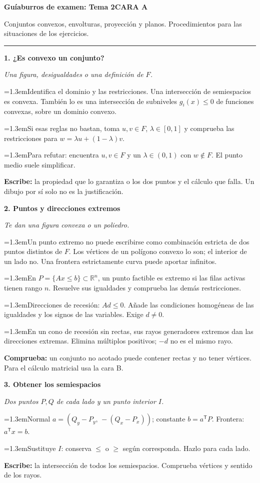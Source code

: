 \documentclass[a4paper,landscape]{article}
\newcommand{\R}{\mathbb R}
\newcommand{\T}{^{\mathsf T}}
\newcommand{\caso}[2]{\par\vspace{5pt}\colorbox{pale}{\parbox{\dimexpr\linewidth-2\fboxsep}{\bfseries\color{accent}#1}}\par\textit{#2}\par}
\newcommand{\paso}[2]{\par\hangindent=1.3em\hangafter=1\makebox[1.3em][l]{\textbf{\color{accent}#1}}#2}
\newcommand{\escribe}[1]{\par\textbf{Escribe:} #1}
\newcommand{\ojo}[1]{\par\textbf{Comprueba:} #1}
\newcommand{\cabecera}[2]{%
  {\fontsize{17}{19}\selectfont\bfseries\color{ink}Guíaburros de examen: Tema 2}\hfill\textbf{\color{accent}#1}\par
  {\color{ink}#2}\par\vspace{2pt}\hrule\vspace{3mm}}
\newcommand{\columna}[1]{\begin{minipage}[t]{0.319\textwidth}\fontsize{9.2}{10.6}\selectfont\RaggedRight #1\end{minipage}}
\begin{document}
\cabecera{CARA A}{Conjuntos convexos, envolturas, proyección y planos. Procedimientos para las situaciones de los ejercicios.}
\noindent
\columna{
\caso{1. ¿Es convexo un conjunto?}{Una figura, desigualdades o una definición de \(F\).}
\paso{1.}{Identifica el dominio y las restricciones. Una intersección de semiespacios es convexa. También lo es una intersección de subniveles \(g_i(x)\le0\) de funciones convexas, sobre un dominio convexo.}
\paso{2.}{Si esas reglas no bastan, toma \(u,v\in F\), \(\lambda\in[0,1]\) y comprueba las restricciones para \(w=\lambda u+(1-\lambda)v\).}
\paso{3.}{Para refutar: encuentra \(u,v\in F\) y un \(\lambda\in(0,1)\) con \(w\notin F\). El punto medio suele simplificar.}
\escribe{la propiedad que lo garantiza o los dos puntos y el cálculo que falla. Un dibujo por sí solo no es la justificación.}

\caso{2. Puntos y direcciones extremos}{Te dan una figura convexa o un poliedro.}
\paso{1.}{Un punto extremo no puede escribirse como combinación estricta de dos puntos distintos de \(F\). Los vértices de un polígono convexo lo son; el interior de un lado no. Una frontera estrictamente curva puede aportar infinitos.}
\paso{2.}{En \(P=\{Ax\le b\}\subset\R^n\), un punto factible es extremo si las filas activas tienen rango \(n\). Resuelve sus igualdades y comprueba las demás restricciones.}
\paso{3.}{Direcciones de recesión: \(Ad\le0\). Añade las condiciones homogéneas de las igualdades y los signos de las variables. Exige \(d\ne0\).}
\paso{4.}{En un cono de recesión sin rectas, sus rayos generadores extremos dan las direcciones extremas. Elimina múltiplos positivos; \(-d\) no es el mismo rayo.}
\ojo{un conjunto no acotado puede contener rectas y no tener vértices. Para el cálculo matricial usa la cara B.}

\caso{3. Obtener los semiespacios}{Dos puntos \(P,Q\) de cada lado y un punto interior \(I\).}
\paso{1.}{Normal \(a=(Q_y-P_y,\,-(Q_x-P_x))\); constante \(b=a\T P\). Frontera: \(a\T x=b\).}
\paso{2.}{Sustituye \(I\): conserva \(\le\) o \(\ge\) según corresponda. Hazlo para cada lado.}
\escribe{la intersección de todos los semiespacios. Comprueba vértices y sentido de los rayos.}
}
\hfill
\end{document}
